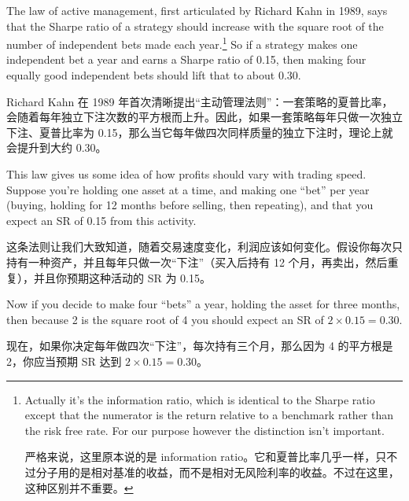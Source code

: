 \begin{englishblock} The law of active management, first articulated by Richard Kahn in 1989, says that the Sharpe ratio of a strategy should increase with the square root of the number of independent bets made each year.\footnote{Actually it's the information ratio, which is identical to the Sharpe ratio except that the numerator is the return relative to a benchmark rather than the risk free rate. For our purpose however the distinction isn't important. \par 严格来说，这里原本说的是 information ratio。它和夏普比率几乎一样，只不过分子用的是相对基准的收益，而不是相对无风险利率的收益。不过在这里，这种区别并不重要。} So if a strategy makes one independent bet a year and earns a Sharpe ratio of 0.15, then making four equally good independent bets should lift that to about 0.30. \end{englishblock}

\begin{chineseblock} Richard Kahn 在 1989 年首次清晰提出“主动管理法则”：一套策略的夏普比率，会随着每年独立下注次数的平方根而上升。因此，如果一套策略每年只做一次独立下注、夏普比率为 0.15，那么当它每年做四次同样质量的独立下注时，理论上就会提升到大约 0.30。 \end{chineseblock}

\bipairgap

\begin{englishblock} This law gives us some idea of how profits should vary with trading speed. Suppose you're holding one asset at a time, and making one ``bet'' per year (buying, holding for 12 months before selling, then repeating), and that you expect an SR of 0.15 from this activity. \end{englishblock}

\begin{chineseblock}这条法则让我们大致知道，随着交易速度变化，利润应该如何变化。假设你每次只持有一种资产，并且每年只做一次“下注”（买入后持有 12 个月，再卖出，然后重复），并且你预期这种活动的 SR 为 0.15。 \end{chineseblock}

\bipairgap

\begin{englishblock} Now if you decide to make four ``bets'' a year, holding the asset for three months, then because 2 is the square root of 4 you should expect an SR of $2 \times 0.15 = 0.30$.\end{englishblock}

\begin{chineseblock}现在，如果你决定每年做四次“下注”，每次持有三个月，那么因为 4 的平方根是 2，你应当预期 SR 达到 \(2 \times 0.15 = 0.30\)。\end{chineseblock}

